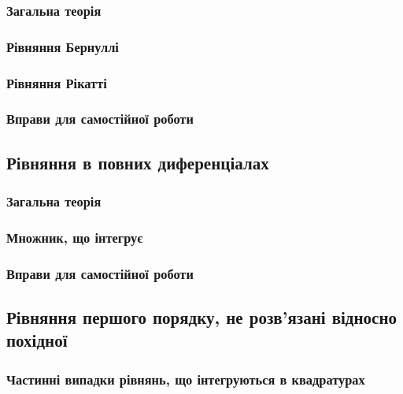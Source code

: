 		\subsubsection{Загальна теорія}
		

		\subsubsection{Рівняння Бернуллі}
		

		\subsubsection{Рівняння Рікатті}
		

		\subsubsection{Вправи для самостійної роботи}
		

	\subsection{Рівняння в повних диференціалах}
	

		\subsubsection{Загальна теорія}
		

		\subsubsection{Множник, що інтегрує}
		

		\subsubsection{Вправи для самостійної роботи}
		

	\subsection{Рівняння першого порядку, не розв'язані відносно похідної}
	

		\subsubsection{Частинні випадки рівнянь, що інтегруються в квадратурах}
		

